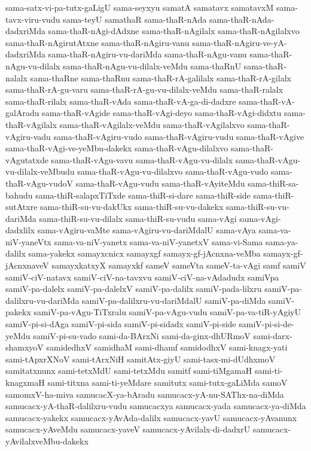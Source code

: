 {sama-satx-vi-pa-tutx-gaLigU
sama-seyxyu
samatA
samatavx
samatavxM
sama-tavx-viru-vudu
sama-teyU
samathaR
sama-thaR-nAda
sama-thaR-nAda-dadxriMda
sama-thaR-nAgi-dAdxne
sama-thaR-nAgilalx
sama-thaR-nAgilalxvo
sama-thaR-nAgirutAtxne
sama-thaR-nAgiru-vanu
sama-thaR-nAgiru-ve-yA-dadxriMda
sama-thaR-nAgiru-vu-dariMda
sama-thaR-nAgu-vanu
sama-thaR-nAgu-vu-dilalx
sama-thaR-nAgu-vu-dilalx-veMdu
sama-thaRnU
sama-thaR-nalalx
sama-thaRne
sama-thaRnu
sama-thaR-rA-galilalx
sama-thaR-rA-gilalx
sama-thaR-rA-gu-varu
sama-thaR-rA-gu-vu-dilalx-veMdu
sama-thaR-ralalx
sama-thaR-rilalx
sama-thaR-vAda
sama-thaR-vA-ga-di-dadxre
sama-thaR-vA-galAradu
sama-thaR-vAgide
sama-thaR-vAgi-deyo
sama-thaR-vAgi-didxtu
sama-thaR-vAgilalx
sama-thaR-vAgilalx-veMdu
sama-thaR-vAgilalxvo
sama-thaR-vAgiru-vadu
sama-thaR-vAgiru-vudo
sama-thaR-vAgiru-vudu
sama-thaR-vAgive
sama-thaR-vAgi-ve-yeMbu-dakekx
sama-thaR-vAgu-dilalxvo
sama-thaR-vAgutatxde
sama-thaR-vAgu-vavu
sama-thaR-vAgu-vu-dilalx
sama-thaR-vAgu-vu-dilalx-veMbudu
sama-thaR-vAgu-vu-dilalxvo
sama-thaR-vAgu-vudo
sama-thaR-vAgu-vudoV
sama-thaR-vAgu-vudu
sama-thaR-vAyiteMdu
sama-thiR-sa-bahudu
sama-thiR-salapxTiTxde
sama-thiR-si-dare
sama-thiR-side
sama-thiR-sutAtxre
sama-thiR-su-vu-dakUkx
sama-thiR-su-vu-dakekx
sama-thiR-su-vu-dariMda
sama-thiR-su-vu-dilalx
sama-thiR-su-vudu
sama-vAgi
sama-vAgi-dadxlilx
sama-vAgiru-vaMte
sama-vAgiru-vu-dariMdalU
sama-vAya
sama-va-niV-yaneVtx
sama-va-niV-yanetx
sama-va-niV-yanetxV
sama-vi-Sama
sama-ya-dalilx
sama-yakekx
samayxcnicx
samayxgf
samayx-gf-jAcnxna-veMba
samayx-gf-jAcnxnaveV
samayxkatxyX
samayxkf
sameV
sameVta
sameV-ta-vAgi
samf
samiV
samiV-ciV-natavx
samiV-ciV-na-tavxvu
samiV-ciV-na-vAdadudx
samiVpa
samiV-pa-dalelx
samiV-pa-dalelxV
samiV-pa-dalilx
samiV-pada-lilxru
samiV-pa-dalilxru-vu-dariMda
samiV-pa-dalilxru-vu-dariMdalU
samiV-pa-diMda
samiV-pakekx
samiV-pa-vAgu-TiTxralu
samiV-pa-vAgu-vudu
samiV-pa-va-tiR-yAgiyU
samiV-pi-si-dAga
samiV-pi-sida
samiV-pi-sidadx
samiV-pi-side
samiV-pi-si-de-yeMdu
samiV-pi-su-vado
sami-da-BArxNi
sami-da-ginx-dhURmoV
sami-darx-shamxyoV
samidedhxV
samidhaM
sami-dhamf
samidodhxV
sami-knagx-yati
sami-tApxrXNoV
sami-tArxNiH
samitAtx-giyU
sami-tasx-mi-dUdhxmoV
samitatxnunx
sami-tetxMdU
sami-tetxMdu
samitf
sami-tiMgamaH
sami-ti-knagxmaH
sami-titxna
sami-ti-yeMdare
samitutx
sami-tutx-gaLiMda
samoV
samomxV-ha-miva
samucacX-ya-bAradu
samucacx-yA-nu-SAThx-na-diMda
samucacx-yA-thaR-dalilxru-vudu
samucacxya
samucacx-yada
samucacx-ya-diMda
samucacx-yakekx
samucacx-yAvAda-dalilx
samucacx-yavU
samucacx-yAvanunx
samucacx-yAveMdu
samucacx-yaveV
samucacx-yAvilalx-di-dadxrU
samucacx-yAvilalxveMbu-dakekx
}
